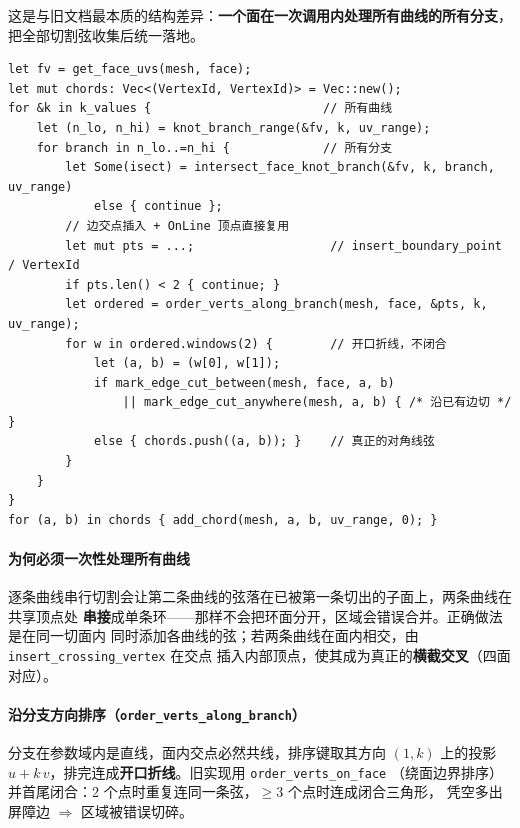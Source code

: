 \documentclass{article}
\begin{document}
这是与旧文档最本质的结构差异：\textbf{一个面在一次调用内处理所有曲线的所有分支}，
把全部切割弦收集后统一落地。

\begin{lstlisting}[]
let fv = get_face_uvs(mesh, face);
let mut chords: Vec<(VertexId, VertexId)> = Vec::new();
for &k in k_values {                        // 所有曲线
    let (n_lo, n_hi) = knot_branch_range(&fv, k, uv_range);
    for branch in n_lo..=n_hi {             // 所有分支
        let Some(isect) = intersect_face_knot_branch(&fv, k, branch, uv_range)
            else { continue };
        // 边交点插入 + OnLine 顶点直接复用
        let mut pts = ...;                   // insert_boundary_point / VertexId
        if pts.len() < 2 { continue; }
        let ordered = order_verts_along_branch(mesh, face, &pts, k, uv_range);
        for w in ordered.windows(2) {        // 开口折线，不闭合
            let (a, b) = (w[0], w[1]);
            if mark_edge_cut_between(mesh, face, a, b)
                || mark_edge_cut_anywhere(mesh, a, b) { /* 沿已有边切 */ }
            else { chords.push((a, b)); }    // 真正的对角线弦
        }
    }
}
for (a, b) in chords { add_chord(mesh, a, b, uv_range, 0); }
\end{lstlisting}

\paragraph{为何必须一次性处理所有曲线}
逐条曲线串行切割会让第二条曲线的弦落在已被第一条切出的子面上，两条曲线在共享顶点处
\textbf{串接}成单条环——那样不会把环面分开，区域会错误合并。正确做法是在同一切面内
同时添加各曲线的弦；若两条曲线在面内相交，由 \texttt{insert\_crossing\_vertex} 在交点
插入内部顶点，使其成为真正的\textbf{横截交叉}（四面对应）。

\paragraph{沿分支方向排序（\texttt{order\_verts\_along\_branch}）}
分支在参数域内是直线，面内交点必然共线，排序键取其方向 $(1,k)$ 上的投影
$u+k\,v$，排完连成\textbf{开口折线}。旧实现用 \texttt{order\_verts\_on\_face}
（绕面边界排序）并首尾闭合：2 个点时重复连同一条弦，$\ge 3$ 个点时连成闭合三角形，
凭空多出屏障边 $\Rightarrow$ 区域被错误切碎。
\end{document}
